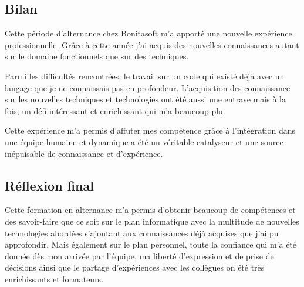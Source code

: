 \subsection{Bilan}
Cette période d'alternance chez Bonitasoft m'a apporté une nouvelle expérience professionnelle. Grâce à cette année j'ai acquis des nouvelles connaissances autant sur le domaine fonctionnels que sur des techniques.

Parmi les difficultés rencontrées, le travail sur un code qui existé déjà avec un langage que je ne connaissais pas en profondeur. L'acquisition des connaissance sur les nouvelles techniques et  technologies ont été aussi une entrave mais à la fois, un défi intéressant et enrichissant qui m'a beaucoup plu.

Cette expérience m'a permis d'affuter mes compétence grâce à l'intégration dans une équipe humaine et dynamique a été un véritable catalyseur et une source inépuisable de connaissance et d'expérience.



\subsection{Réflexion final}
Cette formation en alternance m'a permis d'obtenir beaucoup de compétences et des
savoir-faire que ce soit sur le plan informatique avec la multitude de nouvelles
technologies abordées s'ajoutant aux connaissances déjà acquises que j'ai pu
approfondir. Mais également sur le plan personnel, toute la confiance qui m'a
été donnée dès mon arrivée par l'équipe, ma liberté d'expression et de prise de
décisions ainsi que le partage d'expériences avec les collègues on été très
enrichissants et formateurs.
